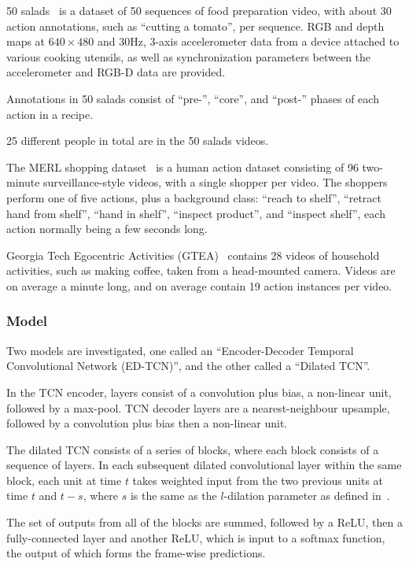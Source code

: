 \documentclass[a4paper, 12pt]{article}
\begin{document}
50 salads~\citet{Stein:2013:CEA:2493432.2493482} is a dataset of 50 sequences of
food preparation video, with about 30 action annotations, such as ``cutting a
tomato'', per sequence. RGB and depth maps at $640 \times 480$ and 30Hz, 3-axis
accelerometer data from a device attached to various cooking utensils, as well
as synchronization parameters between the accelerometer and RGB-D data are
provided.

Annotations in 50 salads consist of ``pre-'', ``core'', and ``post-'' phases of
each action in a recipe.

25 different people in total are in the 50 salads videos.

The MERL shopping dataset~\citet{merl-shopping-singh} is a human action dataset
consisting of 96 two-minute surveillance-style videos, with a single shopper
per video.  The shoppers perform one of five actions, plus a background class:
``reach to shelf'', ``retract hand from shelf'', ``hand in shelf'', ``inspect
product'', and ``inspect shelf'', each action normally being a few seconds
long.

Georgia Tech Egocentric Activities (GTEA)~\citet{Fathi:2011:LRO:2191740.2191834}
contains 28 videos of household activities, such as making coffee, taken from a
head-mounted camera.  Videos are on average a minute long, and on average
contain 19 action instances per video.

\subsubsection{Model}

Two models are investigated, one called an ``Encoder-Decoder Temporal
Convolutional Network (ED-TCN)'', and the other called a ``Dilated TCN''.

In the TCN encoder, layers consist of a convolution plus bias, a non-linear
unit, followed by a max-pool. TCN decoder layers are a nearest-neighbour
upsample, followed by a convolution plus bias then a non-linear unit.

The dilated TCN consists of a series of blocks, where each block consists of a
sequence of layers. In each subsequent dilated convolutional layer within the
same block, each unit at time $t$ takes weighted input from the two previous
units at time $t$ and $t - s$, where $s$ is the same as the $l$-dilation
parameter as defined in~\citet{DBLP:journals/corr/YuK15}.

The set of outputs from all of the blocks are summed, followed by a ReLU, then
a fully-connected layer and another ReLU\@, which is input to a softmax
function, the output of which forms the frame-wise predictions.
\end{document}
